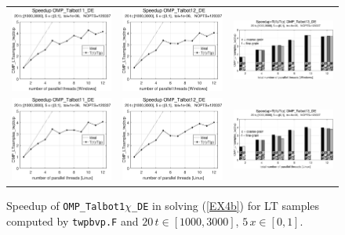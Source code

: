 \documentclass[a4paper,10pt]{report}%
\begin{document}
\begin{figure}[htb]
\centering
\begin{tabular}{ccc} %
\includegraphics[height=0.2\textwidth]{./FIGS/EX4b/EX4b_twpbvp_speedup_11_20t_1000_Windows.eps} &
\includegraphics[height=0.2\textwidth]{./FIGS/EX4b/EX4b_twpbvp_speedup_12_20t_1000_Windows.eps} &
\includegraphics[height=0.2\textwidth,keepaspectratio=true]{./FIGS/EX4b/EX4b_twpbvp_speedup_13_20t_1000_Windows.eps} \\
\includegraphics[height=0.2\textwidth]{./FIGS/EX4b/EX4b_twpbvp_speedup_11_20t_1000_Linux.eps} &
\includegraphics[height=0.2\textwidth]{./FIGS/EX4b/EX4b_twpbvp_speedup_12_20t_1000_Linux.eps} &
\includegraphics[height=0.2\textwidth,keepaspectratio=true]{./FIGS/EX4b/EX4b_twpbvp_speedup_13_20t_1000_Linux.eps}
\end{tabular}
\caption{\small Speedup of {\tt OMP\_Talbot1$\chi$\_DE} in solving (\ref{EX4b}) for LT samples computed
by {\tt twpbvp.F} and $20\,t\in[1000,3000]$, $5\,x\in[0,1]$.}
\label{PAR_EX4b_speedup_twpbvp4}
\end{figure}
\end{document}

